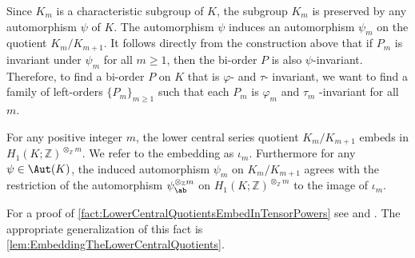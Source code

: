 \documentclass{amsart}
\begin{document}
Since $K_m$ is a characteristic subgroup of $K$, the subgroup $K_m$ is preserved by any automorphism $\psi$ of $K$. The automorphism $\psi$ induces an automorphism $\psi_m$ on the quotient $K_m/K_{m+1}$. It follows directly from the construction above that if $P_m$  is invariant under $\psi_m$ for all $m \geq 1$, then the bi-order $P$ is also $\psi$-invariant. Therefore, to find a bi-order $P$ on $K$ that is $\varphi$- and $\tau$- invariant, we want to find a family of left-orders $\{P_m\}_{m \geq 1}$ such that each $P_m$ is $\varphi_m$ and $\tau_m$ -invariant for all $m$.

\begin{fact}
\label{fact:LowerCentralQuotientsEmbedInTensorPowers} For any positive integer $m$, the lower central series quotient $K_m/K_{m+1}$ embeds in $H_1(K;\mathbb{Z})^{\otimes_{\mathbb{Z}} m}$. We refer to the embedding as $\iota_m$.  Furthermore for any $\psi\in \Aut(K)$, the induced automorphism $\psi_m$ on $K_m/K_{m+1}$ agrees with the restriction of the automorphism $\psi_{\ab}^{\otimes_\mathbb{Z}m}$ on $H_1(K;\mathbb{Z})^{\otimes_{\mathbb{Z}} m}$ to the image of $\iota_m$.     
\end{fact}
\noindent
For a proof of \cref{fact:LowerCentralQuotientsEmbedInTensorPowers} see \cite[Lemma 3.1]{CaiClayRolfsen} and \cite{PerronRolfsen03}. The appropriate generalization of this fact is \cref{lem:EmbeddingTheLowerCentralQuotients}.
\end{document}

